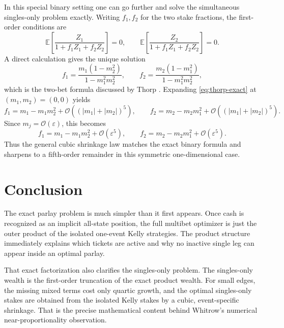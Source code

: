 \documentclass[11pt]{article}
\numberwithin{equation}{section}
\theoremstyle{remark}
\theoremstyle{definition}
\newcommand{\E}{\mathbb{E}}
\newcommand{\1}{\mathbf{1}}
\newcommand{\OO}{\mathcal{O}}
\newcommand{\eps}{\varepsilon}
\begin{document}
In this special binary setting one can go further and solve the simultaneous singles-only problem exactly. Writing $f_1,f_2$ for the two stake fractions, the first-order conditions are
\[
  \E\!\left[\frac{Z_1}{1+f_1Z_1+f_2Z_2}\right]=0,
  \qquad
  \E\!\left[\frac{Z_2}{1+f_1Z_1+f_2Z_2}\right]=0.
\]
A direct calculation gives the unique solution
\begin{equation}
  f_1=\frac{m_1(1-m_2^2)}{1-m_1^2m_2^2},
  \qquad
  f_2=\frac{m_2(1-m_1^2)}{1-m_1^2m_2^2},
  \label{eq:thorp-exact}
\end{equation}
which is the two-bet formula discussed by Thorp \cite{Thorp2006}. Expanding \eqref{eq:thorp-exact} at $(m_1,m_2)=(0,0)$ yields
\[
  f_1=m_1-m_1m_2^2+\OO\!\left((|m_1|+|m_2|)^5\right),
  \qquad
  f_2=m_2-m_2m_1^2+\OO\!\left((|m_1|+|m_2|)^5\right).
\]
Since $m_j=\OO(\eps)$, this becomes
\[
  f_1=m_1-m_1m_2^2+\OO(\eps^5),
  \qquad
  f_2=m_2-m_2m_1^2+\OO(\eps^5).
\]
Thus the general cubic shrinkage law matches the exact binary formula and sharpens to a fifth-order remainder in this symmetric one-dimensional case.

\section{Conclusion}
The exact parlay problem is much simpler than it first appears. Once cash is recognized as an implicit all-state position, the full multibet optimizer is just the outer product of the isolated one-event Kelly strategies. The product structure immediately explains which tickets are active and why no inactive single leg can appear inside an optimal parlay.

That exact factorization also clarifies the singles-only problem. The singles-only wealth is the first-order truncation of the exact product wealth. For small edges, the missing mixed terms cost only quartic growth, and the optimal singles-only stakes are obtained from the isolated Kelly stakes by a cubic, event-specific shrinkage. That is the precise mathematical content behind Whitrow's numerical near-proportionality observation.
\end{document}
